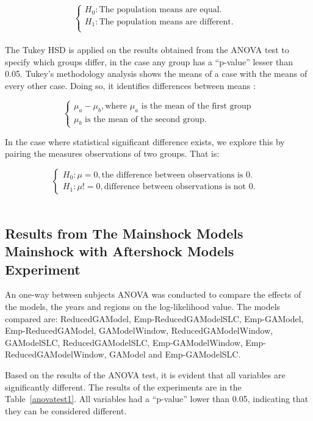 $$\begin{cases} H_0: \text{The population means are equal.} &\\
H_1: \text{The population means are different.}&\\
\end{cases}$$\\

The Tukey HSD is applied on the results obtained from the ANOVA test to specify which groups differ, in the case any group has a ``p-value'' lesser than 0.05. Tukey's methodology analysis shows the means of a case with the means of every other case. Doing so, it identifies differences between means :

$$\begin{cases}
\mu_a-\mu_b, \text{where $\mu_a$ is the mean of the first group}\\
                \text{$\mu_b$ is the mean of the second group.}
\end{cases}$$

In the case where statistical significant difference exists, we explore this by pairing the measures observations of two groups. That is:

$$\begin{cases}
H_0: \mu = 0, \text{the difference between observations is 0.}&\\
H_1: \mu != 0, \text{difference between observations is not 0.}
\end{cases}$$\\


\subsection{Results from The Mainshock Models Mainshock with Aftershock Models Experiment}\label{resultsBigExp}

An one-way between subjects ANOVA was conducted to compare the effects of the models, the years and regions on the log-likelihood value. The models compared are: ReducedGAModel, Emp-ReducedGAModelSLC, Emp-GAModel, Emp-ReducedGAModel, GAModelWindow, ReducedGAModelWindow, GAModelSLC, ReducedGAModelSLC, Emp-GAModelWindow, Emp-ReducedGAModelWindow, GAModel and Emp-GAModelSLC.

Based on the results of the ANOVA test, it is evident that all variables are significantly different. The results of the experiments are in the Table~\ref{anovatest1}. All variables had a ``p-value'' lower than 0.05, indicating that they can be considered different.

